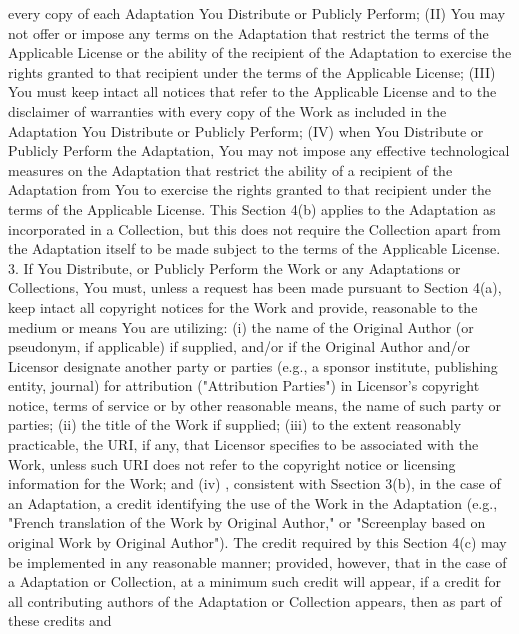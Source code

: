 {   every copy of each Adaptation You Distribute or Publicly Perform;
   (II) You may not offer or impose any terms on the Adaptation that
   restrict the terms of the Applicable License or the ability of the
   recipient of the Adaptation to exercise the rights granted to that
   recipient under the terms of the Applicable License; (III) You must
   keep intact all notices that refer to the Applicable License and to
   the disclaimer of warranties with every copy of the Work as
   included in the Adaptation You Distribute or Publicly Perform; (IV)
   when You Distribute or Publicly Perform the Adaptation, You may not
   impose any effective technological measures on the Adaptation that
   restrict the ability of a recipient of the Adaptation from You to
   exercise the rights granted to that recipient under the terms of
   the Applicable License. This Section 4(b) applies to the Adaptation
   as incorporated in a Collection, but this does not require the
   Collection apart from the Adaptation itself to be made subject to
   the terms of the Applicable License.
\\[4pt]
   3. If You Distribute, or Publicly Perform the Work or any
   Adaptations or Collections, You must, unless a request has been
   made pursuant to Section 4(a), keep intact all copyright notices
   for the Work and provide, reasonable to the medium or means You are
   utilizing: (i) the name of the Original Author (or pseudonym, if
   applicable) if supplied, and/or if the Original Author and/or
   Licensor designate another party or parties (e.g., a sponsor
   institute, publishing entity, journal) for attribution
   ("Attribution Parties") in Licensor's copyright notice, terms of
   service or by other reasonable means, the name of such party or
   parties; (ii) the title of the Work if supplied; (iii) to the
   extent reasonably practicable, the URI, if any, that Licensor
   specifies to be associated with the Work, unless such URI does not
   refer to the copyright notice or licensing information for the
   Work; and (iv) , consistent with Ssection 3(b), in the case of an
   Adaptation, a credit identifying the use of the Work in the
   Adaptation (e.g., "French translation of the Work by Original
   Author," or "Screenplay based on original Work by Original
   Author"). The credit required by this Section 4(c) may be
   implemented in any reasonable manner; provided, however, that in
   the case of a Adaptation or Collection, at a minimum such credit
   will appear, if a credit for all contributing authors of the
   Adaptation or Collection appears, then as part of these credits and
}
